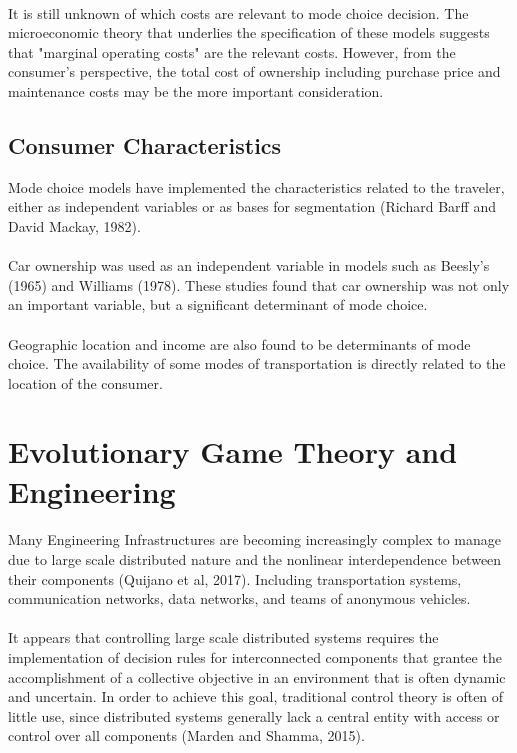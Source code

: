 \paragraph{}It is still unknown of which costs are relevant to mode choice decision. The microeconomic theory that underlies the specification of these models suggests that "marginal operating costs" are the relevant costs. However, from the consumer's perspective, the total cost of ownership including purchase price and maintenance costs may be the more important consideration.  

\subsection{Consumer Characteristics}
Mode choice models have implemented the characteristics related to the traveler, either as independent variables or as bases for segmentation (Richard Barff and David Mackay, 1982).
\paragraph{}
Car ownership was used as an independent variable in models such as Beesly's (1965) and Williams (1978). These studies found that car ownership was not only an important variable, but a significant determinant of mode choice.
\paragraph{}
Geographic location and income are also found to be determinants of mode choice. The availability of some modes of transportation is directly related to the location of the consumer.

\section{Evolutionary Game Theory and Engineering}
\paragraph{}Many Engineering Infrastructures are becoming increasingly complex to manage due to large scale distributed nature and the nonlinear interdependence between their components (Quijano et al, 2017). Including transportation systems, communication networks, data networks, and teams of anonymous vehicles.
\paragraph{}
It appears that controlling large scale distributed systems requires the implementation of decision rules for interconnected components that grantee the accomplishment of a collective objective in an environment that is often dynamic and uncertain. In order to achieve this goal, traditional control theory is often of little use, since distributed systems generally lack a central  entity with access or control over all components (Marden and Shamma, 2015).
